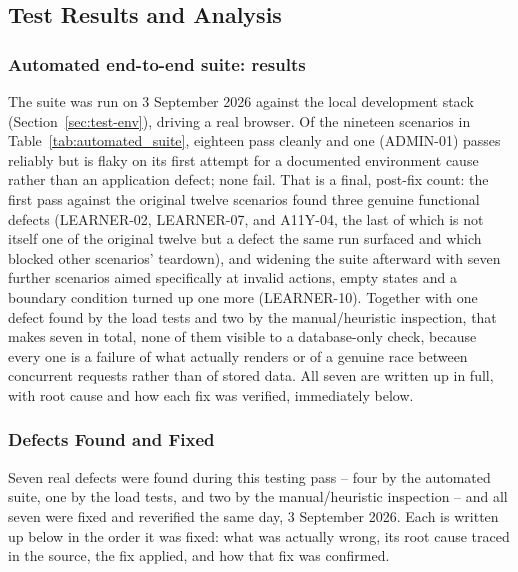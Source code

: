 \documentclass[12pt, oneside]{article} %
\begin{document}
\subsection{Test Results and Analysis}
\label{sec:test-results}

\subsubsection{Automated end-to-end suite: results}

The suite was run on 3 September 2026 against the local development stack (Section~\ref{sec:test-env}), driving a real browser. Of the nineteen scenarios in Table~\ref{tab:automated_suite}, eighteen pass cleanly and one (ADMIN-01) passes reliably but is flaky on its first attempt for a documented environment cause rather than an application defect; none fail. That is a final, post-fix count: the first pass against the original twelve scenarios found three genuine functional defects (LEARNER-02, LEARNER-07, and A11Y-04, the last of which is not itself one of the original twelve but a defect the same run surfaced and which blocked other scenarios' teardown), and widening the suite afterward with seven further scenarios aimed specifically at invalid actions, empty states and a boundary condition turned up one more (LEARNER-10). Together with one defect found by the load tests and two by the manual/heuristic inspection, that makes seven in total, none of them visible to a database-only check, because every one is a failure of what actually renders or of a genuine race between concurrent requests rather than of stored data. All seven are written up in full, with root cause and how each fix was verified, immediately below.

\subsubsection{Defects Found and Fixed}
\label{sec:test-defects}

Seven real defects were found during this testing pass -- four by the automated suite, one by the load tests, and two by the manual/heuristic inspection -- and all seven were fixed and reverified the same day, 3 September 2026. Each is written up below in the order it was fixed: what was actually wrong, its root cause traced in the source, the fix applied, and how that fix was confirmed.
\end{document}

